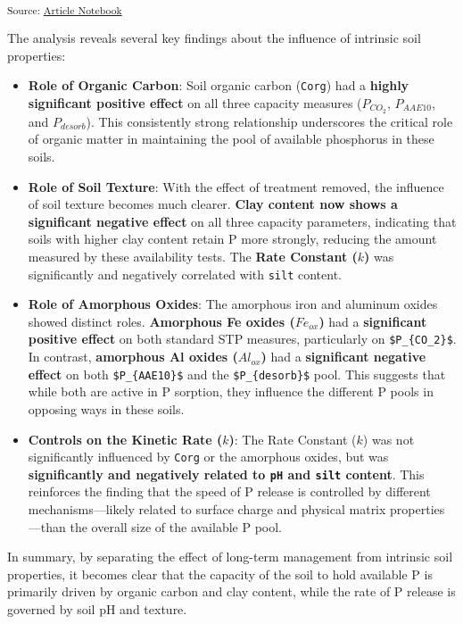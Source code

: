 \documentclass[
  a4paper,
]{article}
\begin{document}
\textsubscript{Source:
\href{https://Andrapodon.github.io/Master-Thesis-P-kinetics/index.qmd.html}{Article
Notebook}}

The analysis reveals several key findings about the influence of
intrinsic soil properties:

\begin{itemize}
\item
  \textbf{Role of Organic Carbon}: Soil organic carbon (\texttt{Corg})
  had a \textbf{highly significant positive effect} on all three
  capacity measures (\(P_{CO_2}\), \(P_{AAE10}\), and \(P_{desorb}\)).
  This consistently strong relationship underscores the critical role of
  organic matter in maintaining the pool of available phosphorus in
  these soils.
\item
  \textbf{Role of Soil Texture}: With the effect of treatment removed,
  the influence of soil texture becomes much clearer. \textbf{Clay
  content now shows a significant negative effect} on all three capacity
  parameters, indicating that soils with higher clay content retain P
  more strongly, reducing the amount measured by these availability
  tests. The \textbf{Rate Constant (\(k\))} was significantly and
  negatively correlated with \texttt{silt} content.
\item
  \textbf{Role of Amorphous Oxides}: The amorphous iron and aluminum
  oxides showed distinct roles. \textbf{Amorphous Fe oxides
  (\(Fe_{ox}\))} had a \textbf{significant positive effect} on both
  standard STP measures, particularly on \texttt{\$P\_\{CO\_2\}\$}. In
  contrast, \textbf{amorphous Al oxides (\(Al_{ox}\))} had a
  \textbf{significant negative effect} on both \texttt{\$P\_\{AAE10\}\$}
  and the \texttt{\$P\_\{desorb\}\$} pool. This suggests that while both
  are active in P sorption, they influence the different P pools in
  opposing ways in these soils.
\item
  \textbf{Controls on the Kinetic Rate (\(k\))}: The Rate Constant
  (\(k\)) was not significantly influenced by \texttt{Corg} or the
  amorphous oxides, but was \textbf{significantly and negatively related
  to \texttt{pH} and \texttt{silt} content}. This reinforces the finding
  that the speed of P release is controlled by different
  mechanisms---likely related to surface charge and physical matrix
  properties---than the overall size of the available P pool.
\end{itemize}

In summary, by separating the effect of long-term management from
intrinsic soil properties, it becomes clear that the capacity of the
soil to hold available P is primarily driven by organic carbon and clay
content, while the rate of P release is governed by soil pH and texture.
\end{document}
